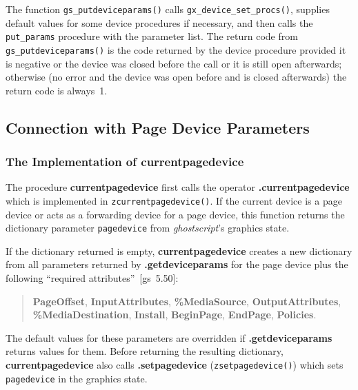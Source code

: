 \documentclass[twoside,a4paper]{article}
\newcommand{\gs}{\textit{ghostscript\/}}
\newcommand{\ps}[1]{{\sffamily\bfseries #1}}	%
\newcommand{\prog}[1]{\texttt{#1}}
\newif\ifdraft \draftfalse
\begin{document}
\ifdraft
??? Add description of error processing for undefined values.
\fi

The function \prog{gs\_putdeviceparams()} calls
\prog{gx\_device\_set\_procs()},
supplies default values for some device procedures if necessary,
and then calls the \prog{put\_params} procedure with the parameter list.
The return code from \prog{gs\_putdeviceparams()} is the code returned by the
device procedure provided it is negative or the device was closed before the
call or it is still open afterwards;
otherwise (no error and the device was open before and is closed afterwards)
the return code is always~1.


\subsection{Connection with Page Device Parameters}


\subsubsection{The Implementation of \ps{currentpagedevice}}

The procedure \ps{currentpagedevice} first calls the operator
\ps{.currentpagedevice} which is implemented in \prog{zcurrentpagedevice()}.
If the current device is a page device or acts as a forwarding device
for a page device,
this function returns the dictionary parameter \prog{pagedevice} from
\gs's graphics state.

If the dictionary returned is empty, \ps{currentpagedevice}
creates a new dictionary from all
parameters returned by \ps{.getdeviceparams} for the page device plus
the following ``required attributes''~[gs~5.50]:
\begin{quote}
  \ps{PageOffset},
  \ps{InputAttributes},
  \ps{\%MediaSource},
  \ps{OutputAttributes},
  \ps{\%MediaDestination},
  \ps{Install},
  \ps{BeginPage},
  \ps{EndPage},
  \ps{Policies}.
\end{quote}
The default values for these parameters are overridden if \ps{.getdeviceparams}
returns values for them.
Before returning the resulting dictionary,
\ps{currentpagedevice} also calls \ps{.setpagedevice} (\prog{zsetpagedevice()})
which sets \prog{pagedevice} in the graphics state.
\end{document}
